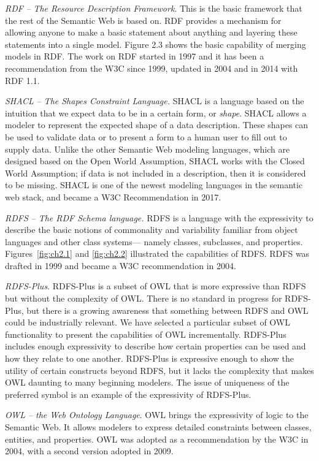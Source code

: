 \emph{RDF} \emph{--} \emph{The Resource Description Framework}. This is
the basic framework that the rest of the Semantic Web is based on. RDF
provides a mechanism for allowing anyone to make a basic statement about
anything and layering these statements into a single model. Figure 2.3
shows the basic capability of merging models in RDF. The work on RDF
started in 1997 and it has been a recommendation from the W3C since
1999, updated in 2004 and in 2014 with RDF 1.1.

\emph{SHACL} \emph{-- The Shapes Constraint Language.} SHACL is a language
based on the intuition that we expect data to be in a certain form, or \emph{shape}.
SHACL allows a modeler to represent the expected shape of a data description. These shapes can be
used to validate data or to present a form to a human user to fill out to supply data.
Unlike the other Semantic Web modeling languages, which are designed based on the Open World Assumption, SHACL works with the Closed World Assumption; if data is not included in   a description, then it is considered to be missing. 
SHACL is one of the newest modeling languages in the semantic web stack, and became a
W3C Recommendation in 2017. 

\emph{RDFS} \emph{-- The RDF Schema language.} RDFS is a language with
the expressivity to describe the basic notions of commonality and
variability familiar from object languages and other class systems---
namely classes, subclasses, and properties. Figures~\ref{fig:ch2.1} and \ref{fig:ch2.2}
illustrated the capabilities of RDFS. RDFS was drafted in 1999 and
became a W3C recommendation in 2004.

\emph{RDFS-Plus}. RDFS-Plus is a subset of OWL that is more expressive
than RDFS but without the complexity of OWL. There is no standard in
progress for RDFS-Plus, but there is a growing awareness that something
between RDFS and OWL could be industrially relevant. We have selected a
particular subset of OWL functionality to present the capabilities of
OWL incrementally. RDFS-Plus includes enough expressivity to describe
how certain properties can be used and how they relate to one another.
RDFS-Plus is expressive enough to show the utility of certain constructs
beyond RDFS, but it lacks the complexity that makes OWL daunting to many
beginning modelers. The issue of uniqueness of the preferred symbol is
an example of the expressivity of RDFS-Plus.

\emph{OWL} \emph{-- the Web Ontology Language}. OWL brings the
expressivity of logic to the Semantic Web. It allows modelers to express
detailed constraints between classes, entities, and properties. OWL was
adopted as a recommendation by the W3C in 2004, with a second version
adopted in 2009.

